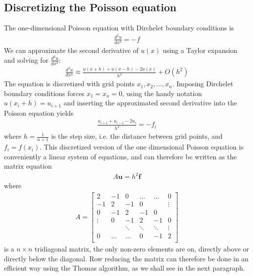 \documentclass[a4paper,11pt, english, twoside]{article}
\begin{document}
\subsection{Discretizing the Poisson equation}
The one-dimensional Poisson equation with Dirchelet boundary conditions is
\begin{align*}
  \frac{d^2 u}{d x^2} = - f
\end{align*}
We can approximate the second derivative of $u(x)$ using a Taylor expansion
and solving for $\frac{d^2 u}{d x^2}$:
\begin{align*}
  \frac{d^2 u}{d x^2} \approx \frac{u(x+h) + u(x-h) - 2 u(x)}{h^2} + O(h^2)
\end{align*}
The equation is discretized with grid points $x_1, x_2, \hdots, x_{n}$. Imposing
Dirchelet boundary conditions forces $x_1 = x_n = 0$, using the handy notation
$u(x_i + h) = u_{i+1}$ and inserting the approximated second derivative into the
Poisson equation yields
\begin{align*}
  \frac{u_{i+1} + u_{i-1} - 2 u_i}{h^2} = -f_i
\end{align*}
where $h = \frac{1}{n+1}$ is the step size, i.e. the distance between grid points, and
$f_i = f(x_i)$. This discretized version of the one dimensional Poisson equation is
conveniently a linear system of equations, and can therefore be written
as the matrix equation
\begin{align*}
  A \mathbf{u} = h^2 \mathbf{f}
\end{align*}
where
\begin{align*}
  A =
  \begin{bmatrix}
    2 & -1 & 0  & \hdots & \hdots &   0    \\
    -1 & 2 & -1 & 0      & &\vdots \\
    0 & -1 & 2  & -1     & 0 &  \\
    \vdots & 0 & -1  & 2     & -1 & 0 \\
    & & \ddots & \ddots & \ddots & \vdots\\
    0 & \hdots  &\hdots & 0 &-1 & 2 \\
\end{bmatrix}
\end{align*}
is a $n \times n$ tridiagonal matrix, the only non-zero elements are on,
directly above or directly below the diagonal. Row reducing the matrix can therefore
be done in an efficient way using the Thomas algorithm, as we shall see in the next paragraph.
\end{document}
